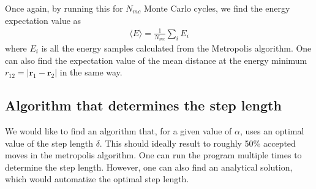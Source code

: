 \documentclass[12pt]{article}
\begin{document}
Once again, by running this for $N_{mc}$ Monte Carlo cycles, we find the energy expectation value as
\begin{align*}
\langle E \rangle = \displaystyle \frac{1}{N_{mc}}\sum_i E_i
\end{align*}
where $E_i$ is all the energy samples calculated from the Metropolis algorithm. One can also find the expectation value of the mean distance at the energy minimum $r_{12} = |\mathbf{r}_1 - \mathbf{r}_2|$ in the same way.

\subsection{Algorithm that determines the step length}
We would like to find an algorithm that, for a given value of $\alpha$, uses an optimal value of the step length $\delta$. This should ideally result to roughly 50\% accepted moves in the metropolis algorithm. One can run the program multiple times to determine the step length. However, one can also find an analytical solution, which would automatize the optimal step length.
\end{document}
